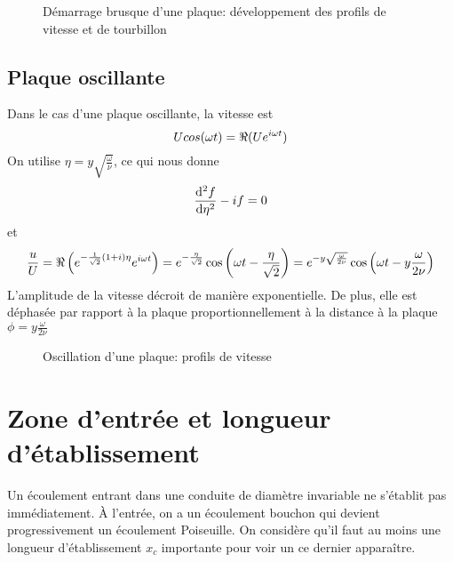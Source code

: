       \begin{figure}[!h]
        \centering
        \begin{minipage}[c]{0.45\textwidth}
          
          \label{fig:demarPlaqueVitesse}
        \end{minipage}
        \begin{minipage}[c]{0.45\textwidth}
          
          \label{fig:demarPlaqueTourb}
        \end{minipage}
        \caption{Démarrage brusque d'une plaque: développement des profils de vitesse et de tourbillon}
      \end{figure}

    \subsection{Plaque oscillante}
      Dans le cas d'une plaque oscillante, la vitesse est
      \begin{equation}
        U cos(\omega t) = \real(U e^{i\omega t})
      \end{equation}
      On utilise $\eta = y \sqrt{\frac{\omega}{\nu}}$, ce qui nous donne
      \begin{equation}
        \dv[2]{f}{\eta} - i f = 0
      \end{equation}
      et
      \begin{equation}
        \frac{u}{U} = \real\left(e^{-\recip{\sqrt{2}}(1+i)\eta}e^{i\omega t}\right)
        = e^{-\frac{\eta}{\sqrt{2}}}\cos\left(\omega t-\frac{\eta}{\sqrt{2}}\right)
        = e^{-y \sqrt{\frac{\omega}{2\nu}}} \cos\left(\omega t - y\frac{\omega}{2\nu}\right)
      \end{equation}
      L'amplitude de la vitesse décroit de manière exponentielle. De plus, elle est déphasée par rapport à la plaque proportionnellement à la distance à la plaque $\phi = y\frac{\omega}{2\nu}$

      \begin{figure}[!h]
        \centering
        
        \caption{Oscillation d'une plaque: profils de vitesse}
        \label{fig:plaqueOsci}
      \end{figure}

  \section{Zone d'entrée et longueur d'établissement}
    Un écoulement entrant dans une conduite de diamètre invariable ne s'établit pas immédiatement. À l'entrée, on a un écoulement bouchon qui devient progressivement un écoulement Poiseuille. On considère qu'il faut au moins une longueur d'établissement $x_c$ importante pour voir un ce dernier apparaître.

